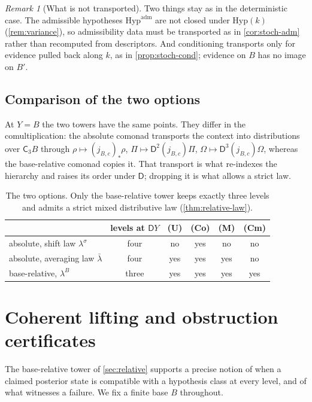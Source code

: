 \documentclass[11pt]{article}
\theoremstyle{definition}
\theoremstyle{remark}
\newtheorem{remark}[theorem]{Remark}
\newcommand{\D}{\mathsf{D}}
\newcommand{\Hyp}{\mathrm{Hyp}}
\newcommand{\C}{\mathsf{C}}
\newcommand{\lb}{\bar\lambda}
\newcommand{\ls}{\lambda^{\sigma}}
\begin{document}
\begin{remark}[What is not transported]
Two things stay as in the deterministic case. The admissible hypotheses $\Hyp^{\mathrm{adm}}$ are not
closed under $\Hyp(k)$ (\cref{rem:variance}), so admissibility data must be transported as in
\cref{cor:stoch-adm} rather than recomputed from descriptors. And conditioning transports only for
evidence pulled back along $k$, as in \cref{prop:stoch-cond}; evidence on $B$ has no image on $B'$.
\end{remark}

\subsection{Comparison of the two options}

At $Y=B$ the two towers have the same points. They differ in the comultiplication: the absolute
comonad transports the context into distributions over $\C_3B$ through
$\rho\mapsto(j_{B,c})_*\rho$, $\Pi\mapsto\D^2(j_{B,c})\Pi$, $\Omega\mapsto\D^3(j_{B,c})\Omega$, whereas the
base-relative comonad copies it. That transport is what re-indexes the hierarchy and raises its order
under $\D$; dropping it is what allows a strict law.

\begin{table}[h]
\centering
\begin{tabular}{@{}lccccc@{}}
\toprule
& levels at $\D Y$ & (U) & (Co) & (M) & (Cm)\\
\midrule
absolute, shift law $\ls$ & four & no & yes & no & no\\
absolute, averaging law $\lb$ & four & yes & yes & yes & no\\
base-relative, $\lambda^B$ & three & yes & yes & yes & yes\\
\bottomrule
\end{tabular}
\caption{The two options. Only the base-relative tower keeps exactly three levels and admits a
strict mixed distributive law (\cref{thm:relative-law}).}
\label{tab:options}
\end{table}

\section{Coherent lifting and obstruction certificates}\label{sec:lifting}

The base-relative tower of \cref{sec:relative} supports a precise notion of when a claimed posterior
state is compatible with a hypothesis class at every level, and of what witnesses a failure. We fix a
finite base $B$ throughout.
\end{document}
